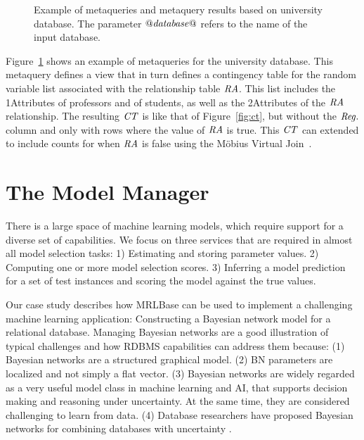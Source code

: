 \documentclass{acm_proc_article-sp}
\begin{document}
\begin{figure}[htb]
\begin{center}
\caption{Example of metaqueries and metaquery results based on university database. The parameter $\it{@database@}$ refers to the name of the input database. 
~\label{fig:meta-query} }
\end{center}
\end{figure}

Figure~\ref{fig:meta-query} shows an example of metaqueries for the university database. This metaquery defines a view that in turn defines a contingency table for the random variable list associated with the relationship table $\mathit{RA}$. This list includes the 1Attributes of professors and of students, as well as the 2Attributes of the $\mathit{RA}$ relationship. The resulting $\it{CT}$ is like that of Figure~\ref{fig:ct}, but without the $\it{Reg.}$ column and only with rows where the value of $\mathit{RA}$ is true. This $\it{CT}$ can extended to include counts for when $\mathit{RA}$ is false using the M\"obius Virtual Join~\cite{Schulte2014}.


\section{The Model Manager}

There is a large space of machine learning models, which require support for a diverse set of capabilities. We focus on three services that are required in almost all model selection tasks: 1) Estimating and storing parameter values. 2) Computing one or more model selection scores. 3) Inferring a model prediction for a set of test instances and scoring the model against the true values. 


Our case study describes how MRLBase can be used to implement a challenging machine learning application: Constructing a Bayesian network model for a relational database. Managing Bayesian networks are a good illustration of typical challenges and how RDBMS capabilities can address them because: (1) Bayesian networks are a structured graphical model. (2) BN parameters are localized and not simply a flat vector. (3) Bayesian networks are widely regarded as a very useful model class in machine learning and AI, that supports decision making and reasoning under uncertainty. At the same time, they are considered challenging to learn from data. (4) Database researchers have proposed Bayesian networks for combining databases with uncertainty \cite{Wang2008,Deshpande2007}. 
%
\end{document}
